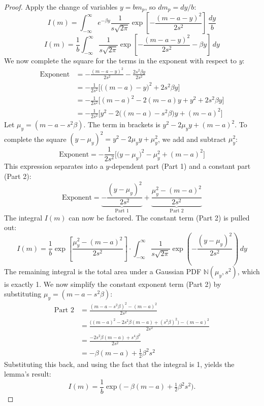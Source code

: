 \documentclass[linenum,doublespace,onecolumn]{SSA-SRL}
\theoremstyle{lemma}
\def\N{\mathbb{N}}
\begin{document}
\begin{proof}
Apply the change of variables \(y=b m_p\), so \(dm_p=dy/b\):
\[
I(m) = \int_{-\infty}^{\infty} e^{-\beta y} \frac{1}{s\sqrt{2\pi}}\exp\!\left[-\frac{(m-a-y)^2}{2s^2}\right]\,\frac{dy}{b}
\]
\[
I(m) = \frac{1}{b} \int_{-\infty}^{\infty} \frac{1}{s\sqrt{2\pi}} \exp\!\left[ -\frac{(m-a-y)^2}{2s^2} - \beta y \right] \,dy
\]
We now complete the square for the terms in the exponent with respect to \(y\):
\begin{align*}
\text{Exponent} &= -\frac{(m-a-y)^2}{2s^2} - \frac{2s^2\beta y}{2s^2} \\
&= -\frac{1}{2s^2}\Big[ \big((m-a)-y\big)^2 + 2s^2\beta y \Big] \\
&= -\frac{1}{2s^2}\Big[ (m-a)^2 - 2(m-a)y + y^2 + 2s^2\beta y \Big] \\
&= -\frac{1}{2s^2}\Big[ y^2 - 2\big( (m-a) - s^2\beta \big)y + (m-a)^2 \Big]
\end{align*}
Let \(\mu_y = (m-a-s^2\beta)\). The term in brackets is \(y^2 - 2\mu_y y + (m-a)^2\). To complete the square \((y-\mu_y)^2 = y^2 - 2\mu_y y + \mu_y^2\), we add and subtract \(\mu_y^2\):
\[
\text{Exponent} = -\frac{1}{2s^2}\Big[ \big(y - \mu_y\big)^2 - \mu_y^2 + (m-a)^2 \Big]
\]
This expression separates into a \(y\)-dependent part (Part 1) and a constant part (Part 2):
\[
\text{Exponent} = \underbrace{-\frac{(y - \mu_y)^2}{2s^2}}_{\text{Part 1}} + \underbrace{\frac{\mu_y^2 - (m-a)^2}{2s^2}}_{\text{Part 2}}
\]
The integral \(I(m)\) can now be factored. The constant term (Part 2) is pulled out:
\[
I(m) = \frac{1}{b} \exp\!\left[ \frac{\mu_y^2 - (m-a)^2}{2s^2} \right] \cdot \int_{-\infty}^{\infty} \frac{1}{s\sqrt{2\pi}} \exp\!\left( -\frac{(y - \mu_y)^2}{2s^2} \right) \,dy
\]
The remaining integral is the total area under a Gaussian PDF \(\N(\mu_y, s^2)\), which is exactly 1. We now simplify the constant exponent term (Part 2) by substituting \(\mu_y = (m-a-s^2\beta)\):
\begin{align*}
\text{Part 2} &= \frac{(m-a-s^2\beta)^2 - (m-a)^2}{2s^2} \\
&= \frac{\big( (m-a)^2 - 2s^2\beta(m-a) + (s^2\beta)^2 \big) - (m-a)^2}{2s^2} \\
&= \frac{-2s^2\beta(m-a) + s^4\beta^2}{2s^2} \\
&= -\beta(m-a) + \frac{1}{2}\beta^2 s^2
\end{align*}
Substituting this back, and using the fact that the integral is 1, yields the lemma's result:
\[
I(m) = \frac{1}{b}\exp\!\Big(-\beta(m-a)+\tfrac{1}{2}\beta^2 s^2\Big).
\]
\end{proof}
\end{document}
